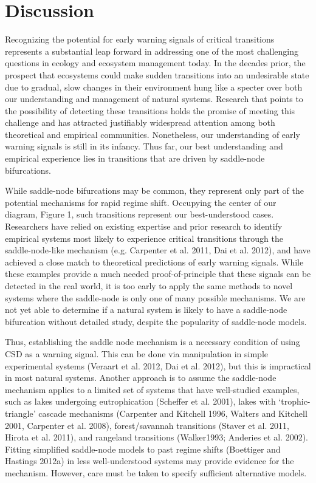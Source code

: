 \documentclass{article}
\begin{document}
\section{Discussion}

Recognizing the potential for early warning signals of critical
transitions represents a substantial leap forward in addressing one of
the most challenging questions in ecology and ecosystem management
today. In the decades prior, the prospect that ecosystems could make
sudden transitions into an undesirable state due to gradual, slow
changes in their environment hung like a specter over both our
understanding and management of natural systems. Research that points to
the possibility of detecting these transitions holds the promise of
meeting this challenge and has attracted justifiably widespread
attention among both theoretical and empirical communities. Nonetheless,
our understanding of early warning signals is still in its infancy. Thus
far, our best understanding and empirical experience lies in transitions
that are driven by saddle-node bifurcations.

While saddle-node bifurcations may be common, they represent only part
of the potential mechanisms for rapid regime shift. Occupying the center
of our diagram, Figure 1, such transitions represent our best-understood
cases. Researchers have relied on existing expertise and prior research
to identify empirical systems most likely to experience critical
transitions through the saddle-node-like mechanism (e.g. Carpenter et
al. 2011, Dai et al. 2012), and have achieved a close match to
theoretical predictions of early warning signals. While these examples
provide a much needed proof-of-principle that these signals can be
detected in the real world, it is too early to apply the same methods to
novel systems where the saddle-node is only one of many possible
mechanisms. We are not yet able to determine if a natural system is
likely to have a saddle-node bifurcation without detailed study, despite
the popularity of saddle-node models.

Thus, establishing the saddle node mechanism is a necessary condition of
using CSD as a warning signal. This can be done via manipulation in
simple experimental systems (Veraart et al. 2012, Dai et al. 2012), but
this is impractical in most natural systems. Another approach is to
assume the saddle-node mechanism applies to a limited set of systems
that have well-studied examples, such as lakes undergoing eutrophication
(Scheffer et al. 2001), lakes with `trophic-triangle' cascade mechanisms
(Carpenter and Kitchell 1996, Walters and Kitchell 2001, Carpenter et
al. 2008), forest/savannah transitions (Staver et al. 2011, Hirota et
al. 2011), and rangeland transitions (Walker1993; Anderies et al. 2002).
Fitting simplified saddle-node models to past regime shifts (Boettiger
and Hastings 2012a) in less well-understood systems may provide evidence
for the mechanism. However, care must be taken to specify sufficient
alternative models.
\end{document}
